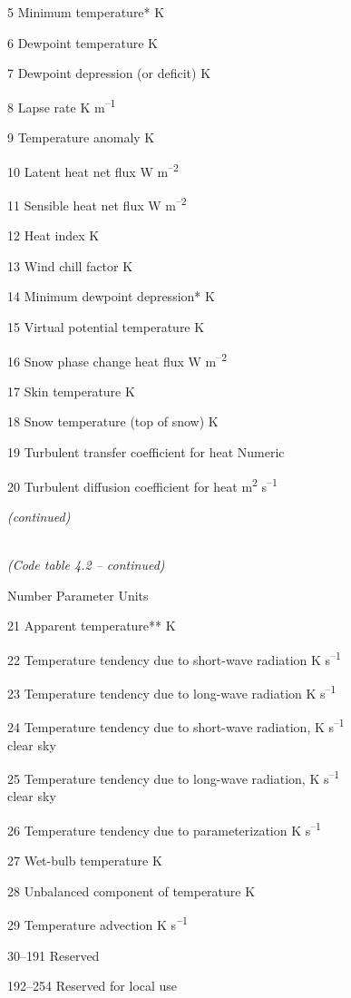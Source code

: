5 Minimum temperature* K

6 Dewpoint temperature K

7 Dewpoint depression (or deficit) K

8 Lapse rate K m\textsuperscript{--1}

9 Temperature anomaly K

10 Latent heat net flux W m\textsuperscript{--2}

11 Sensible heat net flux W m\textsuperscript{--2}

12 Heat index K

13 Wind chill factor K

14 Minimum dewpoint depression* K

15 Virtual potential temperature K

16 Snow phase change heat flux W m\textsuperscript{--2}

17 Skin temperature K

18 Snow temperature (top of snow) K

19 Turbulent transfer coefficient for heat Numeric

20 Turbulent diffusion coefficient for heat m\textsuperscript{2} s\textsuperscript{--1}

\emph{(continued)}

\emph{\\
(Code table 4.2 -- continued)}

Number Parameter Units

21 Apparent temperature** K

22 Temperature tendency due to short-wave radiation K s\textsuperscript{--1}

23 Temperature tendency due to long-wave radiation K s\textsuperscript{--1}

24 Temperature tendency due to short-wave radiation, K s\textsuperscript{--1}\\
clear sky

25 Temperature tendency due to long-wave radiation, K s\textsuperscript{--1}\\
clear sky

26 Temperature tendency due to parameterization K s\textsuperscript{--1}

27 Wet-bulb temperature K

28 Unbalanced component of temperature K

29 Temperature advection K s\textsuperscript{\emph{\textbf{--}}1}

30--191 Reserved

192--254 Reserved for local use

